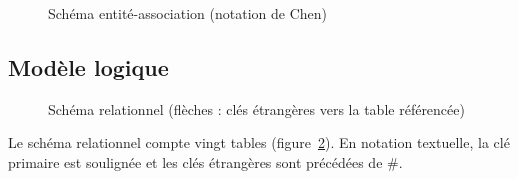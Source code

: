 \begin{figure}[!htbp]
	\centering
	\caption{Schéma entité-association (notation de Chen)}\label{fig:entite_association}
\end{figure}

\subsection{Modèle logique}

\begin{figure}[p]\centering
	\caption{Schéma relationnel (flèches : clés étrangères vers la table référencée)}\label{fig:logical_data_model}
\end{figure}

Le schéma relationnel compte vingt tables (figure~\ref{fig:logical_data_model}). En notation textuelle, la clé primaire est soulignée et les clés étrangères sont précédées de \#.

